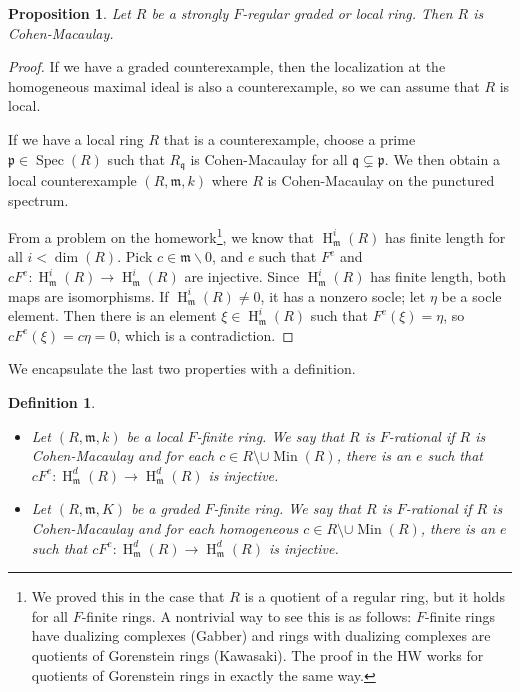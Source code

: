 \documentclass[11pt]{book}
\newtheorem{proposition}[theorem]{Proposition}
\newtheorem{definition}[theorem]{Definition}
\numberwithin{equation}{section}
\numberwithin{theorem}{chapter}
\theoremstyle{definition}
\newtheorem*{basic properties}{Basic Properties}
\newtheorem*{Important Remark}{Important Remark}
\theoremstyle{remark}
\newcommand{\m}{\mathfrak{m}}
\newcommand{\p}{\mathfrak{p}}
\newcommand{\q}{\mathfrak{q}}
\newcommand{\Spec}{\operatorname{Spec}}
\newcommand{\Min}{\operatorname{Min}}
\renewcommand{\dim}{\operatorname{dim}}
\renewcommand{\H}{\operatorname{H}}
\begin{document}
\begin{proposition}
	Let $R$ be a strongly $F$-regular graded or local ring. Then $R$ is Cohen-Macaulay.
\end{proposition}
\begin{proof}
	If we have a graded counterexample, then the localization at the homogeneous maximal ideal is also a counterexample, so we can assume that $R$ is local.
	
	If we have a local ring $R$ that is a counterexample, choose a prime $\p\in \Spec(R)$ such that $R_{\q}$ is Cohen-Macaulay for all $\q \subsetneq \p$. We then obtain a local counterexample $(R,\m,k)$ where $R$ is Cohen-Macaulay on the punctured spectrum.
	
	From a problem on the homework\footnote{We proved this in the case that $R$ is a quotient of a regular ring, but it holds for all $F$-finite rings. A nontrivial way to see this is as follows: $F$-finite rings have dualizing complexes (Gabber) and rings with dualizing complexes are quotients of Gorenstein rings (Kawasaki). The proof in the HW works for quotients of Gorenstein rings in exactly the same way.}, we know that $\H^i_{\m}(R)$ has finite length for all $i<\dim(R)$. Pick  $c\in \m\smallsetminus 0$, and $e$ such that $F^e$ and $cF^e: \H^i_\m(R) \to \H^i_\m(R)$ are injective. Since $\H^i_\m(R)$ has finite length, both maps are isomorphisms. If $\H^i_\m(R)\neq 0$, it has a nonzero socle; let $\eta$ be a socle element. Then there is an element $\xi\in\H^i_\m(R)$ such that $F^e(\xi)=\eta$, so $c F^e(\xi) = c \eta = 0$, which is a contradiction.
\end{proof}

We encapsulate the last two properties with a definition.

\begin{definition}
	\
	\begin{itemize}
		\item Let $(R,\m,k)$ be a local $F$-finite ring. We say that $R$ is \emph{$F$-rational} if $R$ is Cohen-Macaulay and for each $c\in R\setminus \cup \Min(R)$, there is an $e$ such that $cF^e:\H^d_\m(R) \to \H^d_\m(R)$ is injective.
		\item Let $(R,\m,K)$ be a  graded $F$-finite ring. We say that $R$ is \emph{$F$-rational}\index{$F$-rational} if $R$ is Cohen-Macaulay and for each homogeneous $c\in R\setminus \cup \Min(R)$, there is an $e$ such that $cF^e:\H^d_\m(R) \to \H^d_\m(R)$ is injective.
	\end{itemize}
\end{definition}
\end{document}
